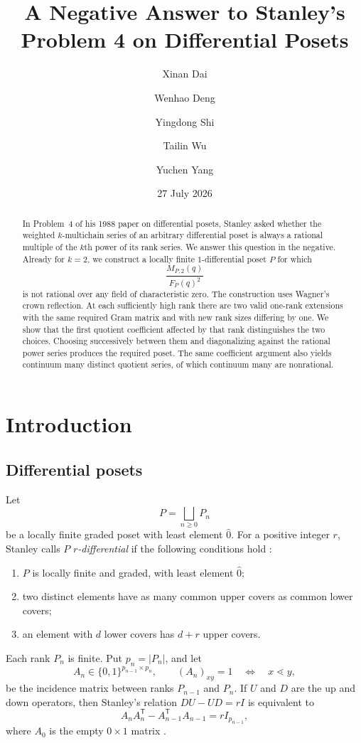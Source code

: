 \documentclass[11pt]{amsart}
\title[Stanley's Problem 4 on differential posets]
{A Negative Answer to Stanley's Problem 4 on Differential Posets}
\author{Xinan Dai}
\author{Wenhao Deng}
\author{Yingdong Shi}
\author{Tailin Wu}
\author{Yuchen Yang}
\date{27 July 2026}
\theoremstyle{remark}
\begin{document}
\begin{abstract}
In Problem~4 of his 1988 paper on differential posets, Stanley asked whether the weighted $k$-multichain series of an arbitrary differential poset is always a rational multiple of the $k$th power of its rank series. We answer this question in the negative. Already for $k=2$, we construct a locally finite $1$-differential poset $P$ for which
\[
\frac{M_{P,2}(q)}{F_P(q)^2}
\]
is not rational over any field of characteristic zero. The construction uses Wagner's crown reflection. At each sufficiently high rank there are two valid one-rank extensions with the same required Gram matrix and with new rank sizes differing by one. We show that the first quotient coefficient affected by that rank distinguishes the two choices. Choosing successively between them and diagonalizing against the rational power series produces the required poset. The same coefficient argument also yields continuum many distinct quotient series, of which continuum many are nonrational.
\end{abstract}

\maketitle
\tableofcontents

\section{Introduction}

\subsection{Differential posets}
Let
\[
P=\bigsqcup_{n\geq 0}P_n
\]
be a locally finite graded poset with least element $\widehat{0}$. For a positive integer $r$, Stanley calls $P$ \emph{$r$-differential} if the following conditions hold \cite[Definition~1.1]{Sta88}:
\begin{enumerate}
\item[(D1)] $P$ is locally finite and graded, with least element $\widehat{0}$;
\item[(D2)] two distinct elements have as many common upper covers as common lower covers;
\item[(D3)] an element with $d$ lower covers has $d+r$ upper covers.
\end{enumerate}
Each rank $P_n$ is finite. Put $p_n=|P_n|$, and let
\[
A_n\in\{0,1\}^{p_{n-1}\times p_n},
\qquad
(A_n)_{xy}=1\quad\Longleftrightarrow\quad x\lessdot y,
\]
be the incidence matrix between ranks $P_{n-1}$ and $P_n$. If $U$ and $D$ are the up and down operators, then Stanley's relation $DU-UD=rI$ is equivalent to
\begin{equation}
A_nA_n^{\mathsf T}-A_{n-1}^{\mathsf T}A_{n-1}=rI_{p_{n-1}},
\label{eq:gram}
\end{equation}
where $A_0$ is the empty $0\times1$ matrix \cite[Theorem~2.2]{Sta88}.
\end{document}
